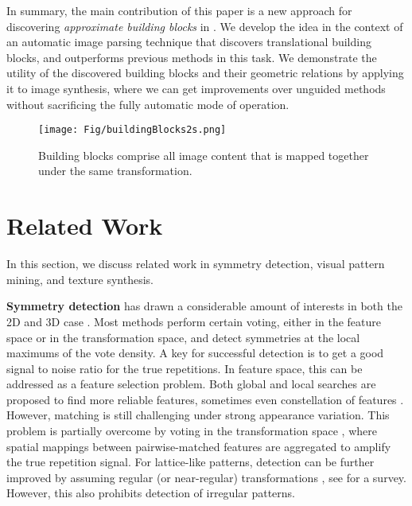 \documentclass{acmtog}
\begin{document}
In summary, the main contribution of this paper is a new  approach for discovering \emph{approximate  building blocks} in . We develop the idea in the context of an automatic image parsing technique that discovers translational building blocks, and outperforms previous methods in this task. We demonstrate the utility of the discovered building blocks and their geometric relations by applying it to image synthesis, where we can get improvements over unguided methods without sacrificing the fully automatic mode of operation.

\begin{figure}
	\centering
		\texttt{[image: Fig/buildingBlocks2s.png]}
	\caption{Building blocks comprise all image content that is mapped together under the same transformation.}
	\label{fig:buildingBlocks}
\end{figure}

\section{Related Work}
\label{sec:RelatedWork}

In this section, we discuss related work in symmetry detection, visual pattern mining, and texture synthesis.

\textbf{Symmetry detection} has drawn a considerable amount of interests in both the 2D \cite{Lee2009SR,Wu2010DL} and 3D case \cite{Mitra2006PAA,Pauly2008,LIPMANsig2010,HuangMesh2013}. Most methods perform certain voting, either in the feature space or in the transformation space, and detect symmetries at the local maximums of the vote density. A key for successful detection is to get a good signal to noise ratio for the true repetitions. In feature space, this can be addressed as a feature selection problem. Both global \cite{Agrawal2012RI,Bokeloh2009SD} and local \cite{Leung1996} searches are proposed to find more reliable features, sometimes even constellation of features \cite{Liu2013GRASP}.
%
However, matching is still challenging under strong appearance variation. This problem is partially overcome by voting in the transformation space \cite{Hays2006Texture,Mitra2006PAA}, where spatial mappings between pairwise-matched features are aggregated to amplify the true repetition signal. For lattice-like patterns, detection can be further improved by assuming regular (or near-regular) transformations \cite{Pauly2008,Wu2010DL,Zhao2011TS,Tai2012PF}, see \cite{Lin2006Eva} for a survey. However, this also prohibits detection of irregular patterns.
\end{document}
